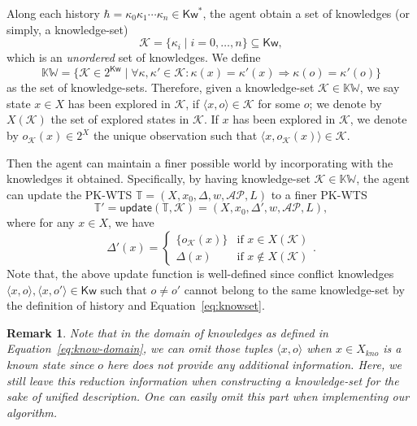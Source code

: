 \documentclass{ifacconf}
\newtheorem{remark}{Remark}
\def \AP{\mathcal{AP}}
\def \K{\mathcal{K}}
\def \<{\langle}
\def \>{\rangle}
\def \T{\mathbb{T}}
\begin{document}
Along each history $\hbar=\kappa_0\kappa_1\cdots\kappa_n\in\textsf{Kw}^*$, 
the agent obtain a set of knowledges (or simply, a knowledge-set) 
\begin{equation}
\mathcal{K}=\{ \kappa_i \mid i=0,\dots,n\}\subseteq \textsf{Kw},
\end{equation}
which is an \emph{unordered} set of knowledges.  We define 
\begin{equation}\label{eq:knowset}
\mathbb{KW}\!=\!\{  \K\!\in\!   2^{\textsf{Kw}} \mid  \forall \kappa,\kappa'\!\in\! \K:  \kappa(x)\!=\! \kappa'(x) \Rightarrow \kappa(o)\!=\! \kappa'(o)           \} 
\end{equation}
as the set of knowledge-sets.  
Therefore, given  a knowledge-set $\K\in \mathbb{KW}$, 
we say state $x\in X$ has been explored in $\K$,  if  $\<x,o\>\in \K$ for some $o$; we denote by $X(\K)$ the set of explored states in $\K$. 
If $x$ has been explored   in $\K$,
we denote by $o_\K(x)\in 2^X$ the unique observation such that 
$\<x,o_\K(x)\> \in \K$.



Then the agent can maintain a finer possible world by incorporating with the knowledges it obtained. Specifically, 
by having knowledge-set $\K \in \mathbb{KW}$, the agent can update the PK-WTS 
$\T=(X,x_0,\Delta,w,\AP,L)$  to a finer PK-WTS 
\[
\T'=\textsf{update}(\T,\K)\!=\!(X,x_0,\Delta',w,\AP,L),
\]
where  for any $x\in X$, we have
\[
\Delta'(x) = 
\left\{ \begin{array}{ll}
\{ o_\K(x)   \} & \text{if }  x\in X(\K) \\
\Delta(x) & \text{if }  x\notin X(\K) 
\end{array} 
\right..
\]
Note that, the above update function is well-defined since 
conflict knowledges $\<x,o\>,\<x,o'\>\in \textsf{Kw}$ such that  $o\neq o'$ cannot belong to the same knowledge-set by the definition of history and Equation~\eqref{eq:knowset}. 

\begin{remark}
Note that in the domain of knowledges as defined in Equation~\eqref{eq:know-domain}, 
we can omit those tuples $\<x,o\>$ when $x\in X_{kno}$ is a known state since $o$ here does not provide any additional information. Here, we still leave this reduction information when constructing a knowledge-set for the sake of unified description. One can easily omit this part when implementing our algorithm. 
\end{remark}
\end{document}
